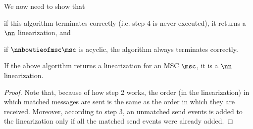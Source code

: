 We now need to show that
\begin{enumerate*}[label={(\roman*)}]
	\item if this algorithm terminates correctly (i.e. step 4 is never executed), it returns a $\nn$ linearization, and
	\item if $\nnbowtieofmsc\msc$ is acyclic, the algorithm always terminates correctly.
\end{enumerate*}
\begin{proposition}
	If the above algorithm returns a linearization for an MSC $\msc$, it is a $\nn$ linearization.
\end{proposition}
\begin{proof}
	Note that, because of how step 2 works, the order (in the linearization) in which matched messages are sent is the same as the order in which they are received. Moreover, according to step 3, an unmatched send events is added to the linearization only if all the matched send events were already added.
\end{proof}

